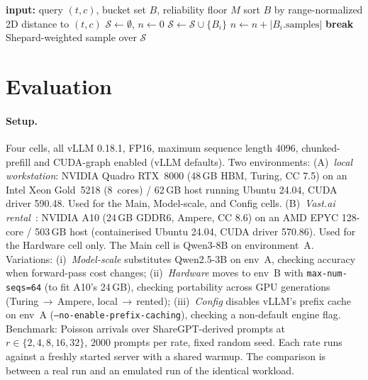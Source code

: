 \documentclass[conference]{IEEEtran}
\begin{document}
\begin{algorithm}[t]
\caption{Density-aware neighbor pooling}
\label{alg:adaptive-k}
\begin{algorithmic}[1]
\STATE \textbf{input:} query $(t,c)$, bucket set $B$, reliability floor $M$
\STATE sort $B$ by range-normalized 2D distance to $(t,c)$
\STATE $\mathcal{S} \leftarrow \emptyset$,\;\; $n \leftarrow 0$
  \STATE $\mathcal{S} \leftarrow \mathcal{S} \cup \{B_i\}$
  \STATE $n \leftarrow n + |B_i.\text{samples}|$
   \STATE \textbf{break} \ENDIF
\ENDFOR
\RETURN Shepard-weighted sample over $\mathcal{S}$
\end{algorithmic}
\end{algorithm}

\section{Evaluation}
\label{sec:results}

\paragraph{Setup.} Four cells, all vLLM 0.18.1, FP16,
maximum sequence length 4096, chunked-prefill and CUDA-graph
enabled (vLLM defaults). Two environments:
(A)~\emph{local workstation}: NVIDIA Quadro RTX~8000 (48\,GB
HBM, Turing, CC 7.5) on an Intel Xeon Gold~5218
(8~cores) / 62\,GB host running Ubuntu 24.04, CUDA driver
590.48. Used for the Main, Model-scale, and Config cells.
(B)~\emph{Vast.ai rental}~\cite{vastai}: NVIDIA A10 (24\,GB
GDDR6, Ampere, CC 8.6) on an AMD EPYC 128-core / 503\,GB host
(containerised Ubuntu 24.04, CUDA driver 570.86).
Used for the Hardware cell only.
The Main cell is Qwen3-8B on environment~A. Variations:
(i)~\emph{Model-scale} substitutes Qwen2.5-3B on env~A,
checking accuracy when forward-pass cost changes;
(ii)~\emph{Hardware} moves to env~B with
\texttt{max-num-seqs=64} (to fit A10's 24\,GB),
checking portability across GPU generations
(Turing\,$\to$\,Ampere, local\,$\to$\,rented);
(iii)~\emph{Config} disables vLLM's prefix cache on env~A
(\texttt{--no-enable-prefix-caching}), checking a non-default
engine flag.
Benchmark: Poisson arrivals over ShareGPT-derived prompts at
$r\in\{2,4,8,16,32\}$, $2000$ prompts per rate, fixed random
seed. Each rate runs against a freshly started server with
a shared warmup. The comparison is between a real run and
an emulated run of the identical workload.
\end{document}
